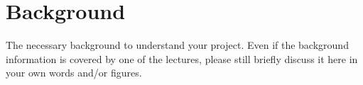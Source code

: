 \section{Background}
\label{sec:background}

The necessary background to understand your project.
Even if the background information is covered by one of the lectures,
please still briefly discuss it here in your own words and/or figures.

